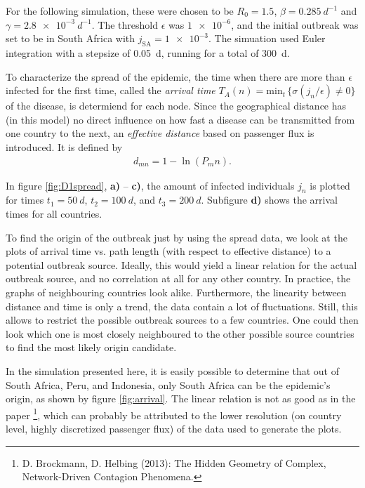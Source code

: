 \documentclass{scrartcl}
\begin{document}
For the following simulation, these were chosen to be $R_0 = 1.5$, $\beta = \SI{0.285}{d^{-1}}$ and $\gamma = \SI{2.8e-3}{d^{-1}}$.
The threshold $\epsilon$ was $\num{1e-6}$, and the initial outbreak was set to be in South Africa with $j_{\mathrm{SA}} = \num{1e-3}$. The simuation used Euler integration with a stepsize of \SI{0.05}{d}, running for a total of \SI{300}{d}.

To characterize the spread of the epidemic, the time when there are more than $\epsilon$ infected for the first time, called the \emph{arrival time} $T_A(n) = \mathrm{min}_t \, \{ \sigma(j_n / \epsilon) \neq 0 \}$ of the disease, is determiend for each node. Since the geographical distance has (in this model) no direct influence on how fast a disease can be transmitted from one country to the next, an \emph{effective distance} based on passenger flux is introduced. It is defined by
\begin{align}
	d_{mn} = 1 - \ln (P_mn). \label{eq:epl}
\end{align}

In figure \ref{fig:D1spread}, \textbf{a)} -- \textbf{c)}, the amount of infected individuals $j_n$ is plotted for times $t_1=\SI{50}{d}$, $t_2 = \SI{100}{d}$, and $t_3 = \SI{200}{d}$. Subfigure \textbf{d)} shows the arrival times for all countries.

To find the origin of the outbreak just by using the spread data, we look at the plots of arrival time vs. path length (with respect to effective distance) to a potential outbreak source. 
Ideally, this would yield a linear relation for the actual outbreak source, and no correlation at all for any other country. In practice, the graphs of neighbouring countries look alike. 
Furthermore, the linearity between distance and time is only a trend, the data contain a lot of fluctuations.
Still, this allows to restrict the possible outbreak sources to a few countries. One could then look which one is most closely neighboured to the other possible source countries to find the most likely origin candidate.

In the simulation presented here, it is easily possible to determine that out of South Africa, Peru, and Indonesia, only South Africa can be the epidemic's origin, as shown by figure \ref{fig:arrival}. The linear relation is not as good as in the paper \footnote{D. Brockmann, D. Helbing (2013): The Hidden Geometry of Complex, Network-Driven Contagion Phenomena.}, which can probably be attributed to the lower resolution (on country level, highly discretized passenger flux) of the data used to generate the plots.
\end{document}
